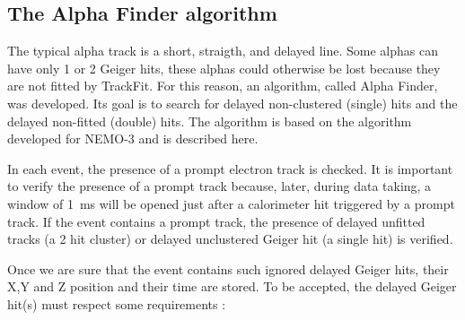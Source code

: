 \documentclass[main.tex]{subfiles}
\begin{document}
\subsection{The Alpha Finder algorithm}


\noindent The typical alpha track is a short, straigth, and delayed line. Some alphas can have only 1 or 2 Geiger hits, these alphas could otherwise be lost because they are not fitted by TrackFit. For this reason, an algorithm, called Alpha Finder, was developed. Its goal is to search for delayed non-clustered (single) hits and the delayed non-fitted (double) hits. The algorithm is based on the algorithm developed for NEMO-3 and is described here. %


\bigskip


\noindent In each event, the presence of a prompt electron track is checked. It is important to verify the presence of a prompt track because, later, during data taking, a window of 1~ms will be opened just after a calorimeter hit triggered by a prompt track. If the event contains a prompt track, the presence of delayed unfitted tracks (a 2 hit cluster) or delayed unclustered Geiger hit (a single hit) is verified.


\bigskip


\noindent Once we are sure that the event contains such ignored delayed Geiger hits, their X,Y and Z position and their time are stored. To be accepted, the delayed Geiger hit(s) must respect some requirements :
\end{document}
